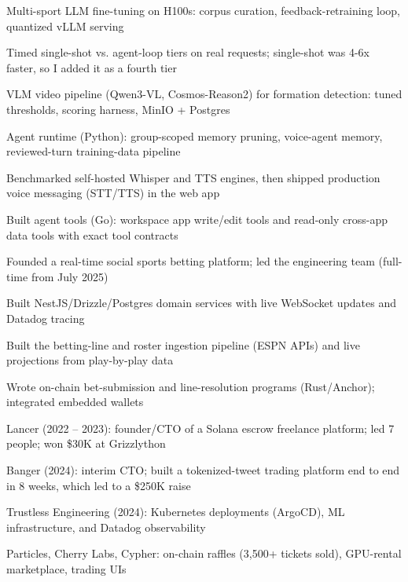 \documentclass[print]{jack-resume}
\begin{document}
\begin{tightemize}
    \item Multi-sport LLM fine-tuning on H100s: corpus curation, feedback-retraining loop, quantized vLLM serving
    \item Timed single-shot vs. agent-loop tiers on real requests; single-shot was 4-6x faster, so I added it as a fourth tier
    \item VLM video pipeline (Qwen3-VL, Cosmos-Reason2) for formation detection: tuned thresholds, scoring harness, MinIO + Postgres
    \item Agent runtime (Python): group-scoped memory pruning, voice-agent memory, reviewed-turn training-data pipeline
    \item Benchmarked self-hosted Whisper and TTS engines, then shipped production voice messaging (STT/TTS) in the web app
    \item Built agent tools (Go): workspace app write/edit tools and read-only cross-app data tools with exact tool contracts
\end{tightemize}
\sectionsep

\begin{tightemize}
    \item Founded a real-time social sports betting platform; led the engineering team (full-time from July 2025)
    \item Built NestJS/Drizzle/Postgres domain services with live WebSocket updates and Datadog tracing
    \item Built the betting-line and roster ingestion pipeline (ESPN APIs) and live projections from play-by-play data
    \item Wrote on-chain bet-submission and line-resolution programs (Rust/Anchor); integrated embedded wallets
\end{tightemize}
\sectionsep

\begin{tightemize}
    \item Lancer (2022 – 2023): founder/CTO of a Solana escrow freelance platform; led 7 people; won \$30K at Grizzlython
    \item Banger (2024): interim CTO; built a tokenized-tweet trading platform end to end in 8 weeks, which led to a \$250K raise
    \item Trustless Engineering (2024): Kubernetes deployments (ArgoCD), ML infrastructure, and Datadog observability
    \item Particles, Cherry Labs, Cypher: on-chain raffles (3,500+ tickets sold), GPU-rental marketplace, trading UIs
\end{tightemize}
\sectionsep
\end{document}

